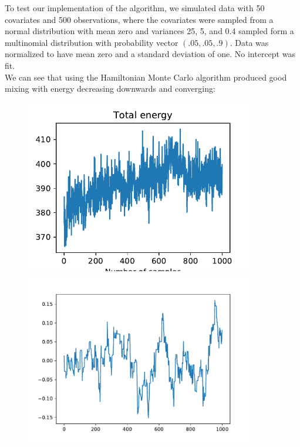 To test our implementation of the algorithm, we simulated data with 50 covariates and 500 observations, where the covariates were sampled from a normal distribution with mean zero and variances 25, 5, and 0.4 sampled form a multinomial distribution with probability vector $(.05, .05, .9)$. Data was normalized to have mean zero and a standard deviation of one. No intercept was fit.\\

We can see that using the Hamiltonian Monte Carlo algorithm produced good mixing with energy decreasing downwards and converging:

\begin{figure}[H]
	\centering
	\begin{minipage}{0.45\textwidth}
		\centering
		\includegraphics[width=0.9\textwidth]{hmc-energy-sim.pdf} %
	\end{minipage}\hfill
	\begin{minipage}{0.45\textwidth}
		\centering
		\includegraphics[width=0.9\textwidth]{hmc-trace-sim.pdf} %
	\end{minipage}
\end{figure}

